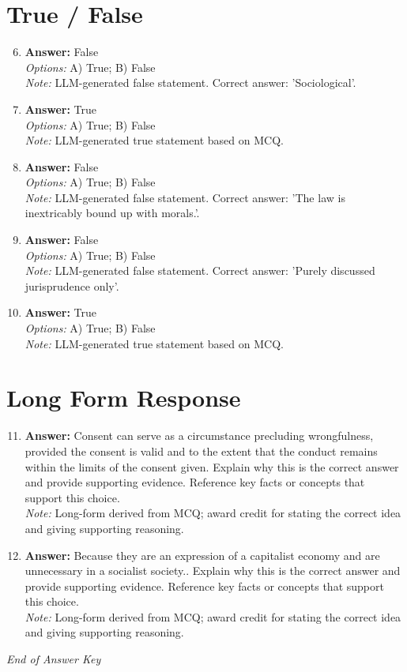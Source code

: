 \documentclass[12pt]{article}
\begin{document}
\section*{True / False}
\begin{enumerate}[label=\arabic*.]
\setcounter{enumi}{5}
\item \textbf{Answer:} False
\\ \textit{Options:} A) True; B) False
\\ \textit{Note:} LLM-generated false statement. Correct answer: 'Sociological'.
\item \textbf{Answer:} True
\\ \textit{Options:} A) True; B) False
\\ \textit{Note:} LLM-generated true statement based on MCQ.
\item \textbf{Answer:} False
\\ \textit{Options:} A) True; B) False
\\ \textit{Note:} LLM-generated false statement. Correct answer: 'The law is inextricably bound up with morals.'.
\item \textbf{Answer:} False
\\ \textit{Options:} A) True; B) False
\\ \textit{Note:} LLM-generated false statement. Correct answer: 'Purely discussed jurisprudence only'.
\item \textbf{Answer:} True
\\ \textit{Options:} A) True; B) False
\\ \textit{Note:} LLM-generated true statement based on MCQ.
\end{enumerate}

\section*{Long Form Response}
\begin{enumerate}[label=\arabic*.]
\setcounter{enumi}{10}
\item \textbf{Answer:} Consent can serve as a circumstance precluding wrongfulness, provided the consent is valid and to the extent that the conduct remains within the limits of the consent given. Explain why this is the correct answer and provide supporting evidence. Reference key facts or concepts that support this choice.
\\ \textit{Note:} Long-form derived from MCQ; award credit for stating the correct idea and giving supporting reasoning.
\item \textbf{Answer:} Because they are an expression of a capitalist economy and are unnecessary in a socialist society.. Explain why this is the correct answer and provide supporting evidence. Reference key facts or concepts that support this choice.
\\ \textit{Note:} Long-form derived from MCQ; award credit for stating the correct idea and giving supporting reasoning.
\end{enumerate}

\vfill
\noindent\textit{End of Answer Key}
\end{document}
